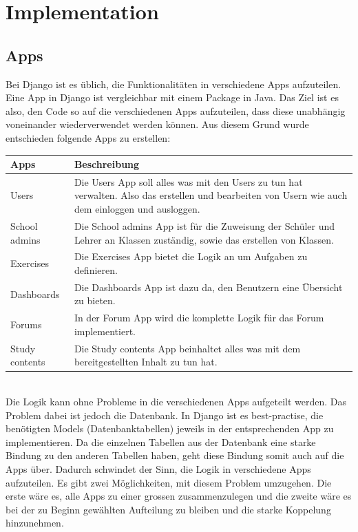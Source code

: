 \section{Implementation}

\subsection{Apps}
Bei Django ist es üblich, die Funktionalitäten in verschiedene Apps aufzuteilen. Eine App in Django ist vergleichbar mit einem Package in Java. Das Ziel ist es also, den Code so auf die verschiedenen Apps aufzuteilen, dass diese unabhängig voneinander wiederverwendet werden können. Aus diesem Grund wurde entschieden folgende Apps zu erstellen: \\
\newline
\begin{tabularx}{\textwidth}{| X | X |}
	\hline
		\textbf{Apps} & \textbf{Beschreibung} \\
	\hline
		Users & Die Users App soll alles was mit den Users zu tun hat verwalten. Also das erstellen und bearbeiten von Usern wie auch dem einloggen und ausloggen. \\
	\hline
		School admins & Die School admins App ist für die Zuweisung der Schüler und Lehrer an Klassen zuständig, sowie das erstellen von Klassen. \\
	\hline
		Exercises & Die Exercises App bietet die Logik an um Aufgaben zu definieren. \\
	\hline 
		Dashboards & Die Dashboards App ist dazu da, den Benutzern eine Übersicht zu bieten. \\
	\hline
		Forums & In der Forum App wird die komplette Logik für das Forum implementiert. \\
	\hline
		Study contents & Die Study contents App beinhaltet alles was mit dem bereitgestellten Inhalt zu tun hat. \\
	\hline
\end{tabularx} \\


\noindent Die Logik kann ohne Probleme in die verschiedenen Apps aufgeteilt werden. Das Problem dabei ist jedoch die Datenbank. In Django ist es best-practise, die benötigten Models (Datenbanktabellen) jeweils in der entsprechenden App zu implementieren. Da die einzelnen Tabellen aus der Datenbank eine starke Bindung zu den anderen Tabellen haben, geht diese Bindung somit auch auf die Apps über. Dadurch schwindet der Sinn, die Logik in verschiedene Apps aufzuteilen. Es gibt zwei Möglichkeiten, mit diesem Problem umzugehen. Die erste wäre es, alle Apps zu einer grossen zusammenzulegen und die zweite wäre es bei der zu Beginn gewählten Aufteilung zu bleiben und die starke Koppelung hinzunehmen. 

